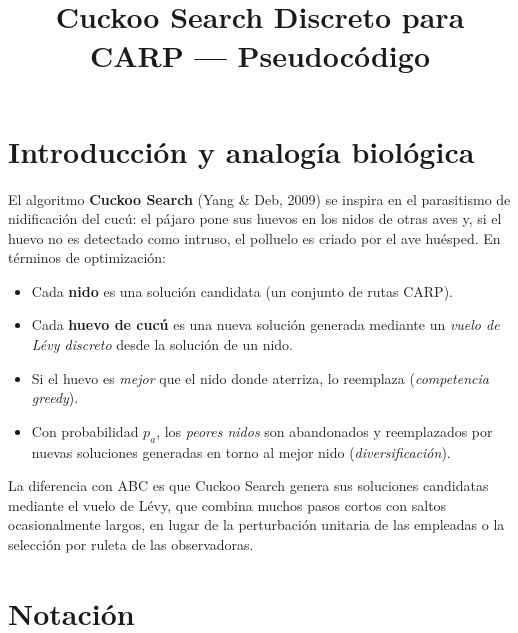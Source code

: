 \documentclass[12pt, a4paper]{article}
\title{Cuckoo Search Discreto para CARP --- Pseudocódigo}
\author{}
\date{}
\begin{document}
\maketitle

\section{Introducción y analogía biológica}

El algoritmo \textbf{Cuckoo Search} (Yang \& Deb, 2009) se inspira en el
parasitismo de nidificación del cucú: el pájaro pone sus huevos en los nidos de
otras aves y, si el huevo no es detectado como intruso, el polluelo es criado por
el ave huésped. En términos de optimización:

\begin{itemize}
    \item Cada \textbf{nido} es una solución candidata (un conjunto de rutas CARP).
    \item Cada \textbf{huevo de cucú} es una nueva solución generada mediante un
          \emph{vuelo de Lévy discreto} desde la solución de un nido.
    \item Si el huevo es \emph{mejor} que el nido donde aterriza, lo reemplaza
          (\emph{competencia greedy}).
    \item Con probabilidad $p_a$, los \emph{peores nidos} son abandonados y
          reemplazados por nuevas soluciones generadas en torno al mejor nido
          (\emph{diversificación}).
\end{itemize}

La diferencia con ABC es que Cuckoo Search genera sus soluciones candidatas
mediante el vuelo de Lévy, que combina muchos pasos cortos con saltos
ocasionalmente largos, en lugar de la perturbación unitaria de las empleadas
o la selección por ruleta de las observadoras.

\section{Notación}
\end{document}

